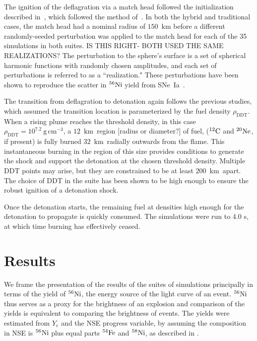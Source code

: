 \documentclass[iop,apj]{emulateapj}
\newcommand{\SNeIa}{SNe~Ia}
\newcommand{\C}[1]{\ensuremath{{}^{#1}{\rm C}}}
\newcommand{\Ne}[1]{\ensuremath{{}^{#1}{\rm Ne}}}
\newcommand{\Ni}[1]{\ensuremath{{}^{#1}{\rm Ni}}}
\newcommand{\Fe}[1]{\ensuremath{{}^{#1}{\rm Fe}}}
\newcommand{\unitspace}{\ensuremath{\,}}
\newcommand{\usp}{\unitspace}
\newcommand{\unitstyle}[1]{\ensuremath{\mathrm{#1}}}
\newcommand{\power}[2]{\ensuremath{{#1}^{#2}}}
\newcommand{\centi}{\unitstyle{c}}
\newcommand{\kilo}{\unitstyle{k}}
\newcommand{\meter}{\unitstyle{m}}
\newcommand{\cm}{\centi\meter}
\newcommand{\gram}{\unitstyle{g}}
\newcommand{\grampercc}{\gram\usp\power{\cm}{-3}} %
\newcommand{\km}{\kilo\meter}   %
\begin{document}
The ignition of the deflagration via a match head followed the
initialization described in~\citet{kruegetal12}, which
followed the method of~\citet{townetal2009}.
In both the hybrid and traditional cases, the match head had a
nominal radius of $150$~km before
a different randomly-seeded perturbation was applied to the
match head for each of the 35 simulations in both suites. {\color{red}
IS THIS RIGHT- BOTH USED THE SAME REALIZATIONS?}
The perturbation to the sphere's surface is a set of
spherical harmonic functions with randomly chosen amplitudes, and
each set of perturbations is referred to as a ``realization."
These perturbations have been shown to reproduce
the scatter in \Ni{56}
yield from \SNeIa\ \citet{townetal2009}.


The transition from deflagration to detonation again follows
the previous studies, which assumed the transition location
is parameterized by the fuel density $\rho_{\mathrm{DDT}}$.
When a rising
plume reaches the threshold density, in this case
$\rho_{\mathrm{DDT}} = 10^{7.2}~\grampercc$,
a $12$~\km\ region {\color{blue} [radius or diameter?]} of fuel, (\C{12} and \Ne{20}, if present) is
fully burned $32$~\km\ radially outwards from the flame. This
instantaneous burning in the region of this size provides conditions
to generate the shock and support the detonation at the chosen
threshold density.  Multiple DDT points may arise, but they are
constrained to be at least $200$~\km\ apart. The choice of DDT
in the suite has been shown to be high enough to ensure
the robust ignition of a detonation shock.

Once the detonation starts, the remaining fuel at densities
high enough for the detonation to propagate is quickly consumed.
The simulations were run to 4.0 s, at which time burning
has effectively ceased.


\section{Results}

We frame the presentation of the results of the suites of simulations
principally in terms of the yield of \Ni{56}, the energy source of
the light curve of an event. \Ni{56} thus serves as a proxy
for the brightness of an explosion and comparison of the yields
is equivalent to comparing the brightness of events. The
yields were estimated from $Y_e$ and the NSE progress
variable, by assuming the composition in NSE is \Ni{56} plus equal
parts \Fe{54} and \Ni{58}, as described in
\citet{townetal2009,Meaketal09}.
\end{document}
